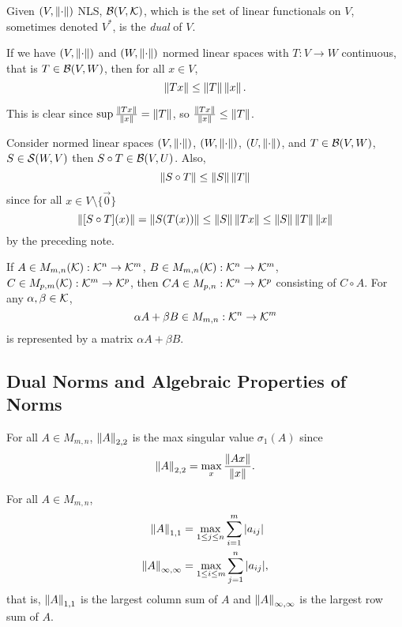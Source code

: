 \begin{definition}
\label{def:dual-space}
Given $(V, \left\lVert\cdot\right\rVert)$ NLS, $\mathcal{B}(V, \mathcal{K})$, which is the set of linear functionals on $V$, sometimes denoted $V^*$, is the \textit{dual} of $V$.
\end{definition}

\begin{note*}
If we have $(V, \left\lVert\cdot\right\rVert)$ and $(W, \left\lVert\cdot\right\rVert)$ normed linear spaces with $T: V \rightarrow W$ continuous, that is $T \in \mathcal{B}(V,W)$, then for all $x \in V$,
$$
\left\lVert Tx\right\rVert \leq \left\lVert T\right\rVert\left\lVert x\right\rVert.
$$

This is clear since $\sup \frac{\left\lVert Tx\right\rVert}{\left\lVert x\right\rVert} = \left\lVert T\right\rVert$, so $\frac{\left\lVert Tx\right\rVert}{\left\lVert x\right\rVert} \leq \left\lVert T\right\rVert$.
\end{note*}

\begin{note*}
Consider normed linear spaces $(V, \left\lVert\cdot\right\rVert)$, $(W, \left\lVert\cdot\right\rVert)$, $(U, \left\lVert\cdot\right\rVert)$, and $T \in \mathcal{B}(V,W)$, $S \in \mathcal{S}(W,V)$ then $S \circ T \in \mathcal{B}(V,U)$. Also,
$$
\left\lVert S \circ T\right\rVert \leq \left\lVert S\right\rVert \left\lVert T\right\rVert
$$
since for all $x \in V \setminus \{\Vec{0}\}$
$$
\left\lVert[S\circ T](x)\right\rVert = \left\lVert S(T(x))\right\rVert \leq \left\lVert S\right\rVert\left\lVert Tx\right\rVert \leq \left\lVert S\right\rVert\left\lVert T\right\rVert\left\lVert x\right\rVert
$$
by the preceding note.
\end{note*}

\begin{note*}
If $A \in M_{m,n}(\mathcal{K}): \mathcal{K}^n \rightarrow \mathcal{K}^m$, $B \in M_{m,n}(\mathcal{K}): \mathcal{K}^n \rightarrow \mathcal{K}^m$, $C \in M_{p,m}(\mathcal{K}): \mathcal{K}^m \rightarrow \mathcal{K}^p$, then $CA \in M_{p,n}: \mathcal{K}^n \rightarrow \mathcal{K}^p$ consisting of $C \circ A$. For any $\alpha, \beta \in \mathcal{K}$,
$$
\alpha A + \beta B \in M_{m,n}: \mathcal{K}^n \rightarrow \mathcal{K}^m
$$
is represented by a matrix $\alpha A + \beta B$.
\end{note*}


\subsection{Dual Norms and Algebraic Properties of Norms}
\begin{note*}
For all $A \in M_{m,n}$, $\left\lVert A\right\rVert_{2,2}$ is the max singular value $\sigma_1(A)$ since
$$
\left\lVert A\right\rVert_{2,2} = \max_{x} \frac{\left\lVert Ax\right\rVert}{\left\lVert x\right\rVert}.
$$
\end{note*}

\begin{proposition}
\label{prop:operator-norm-examples}
For all $A \in M_{m,n}$,
\begin{align*}
    \left\lVert A\right\rVert_{1,1} &= \max_{1 \leq j \leq n} \sum_{i=1}^m |a_{ij}| \\
    \left\lVert A\right\rVert_{\infty, \infty} &= \max_{1 \leq i \leq m} \sum_{j=1}^n |a_{ij}|,
\end{align*}
that is, $\left\lVert A\right\rVert_{1,1}$ is the largest column sum of $A$ and $\left\lVert A\right\rVert_{\infty,\infty}$ is the largest row sum of $A$.
\end{proposition}

